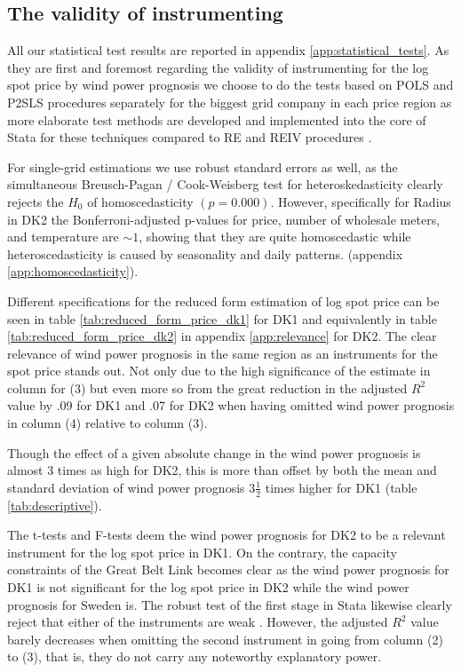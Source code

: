 \subsection{The validity of instrumenting}
\label{subsec:r_validity}
All our statistical test results are reported in appendix \ref{app:statistical_tests}. As they are first and foremost regarding the validity of instrumenting for the log spot price by wind power prognosis we choose to do the tests based on POLS and P2SLS procedures separately for the biggest grid company in each price region as more elaborate test methods are developed and implemented into the core of Stata for these techniques compared to RE and REIV procedures \citep{statacorp2017stata}.
\bigskip\par
For single-grid estimations we use robust standard errors as well, as the simultaneous Breusch-Pagan / Cook-Weisberg test for heteroskedasticity clearly rejects the $H_0$ of homoscedasticity $(p=0.000)$. However, specifically for Radius in DK2 the Bonferroni-adjusted p-values for price, number of wholesale meters, and temperature are $\sim1$, showing that they are quite homoscedastic while heteroscedasticity is caused by seasonality and daily patterns.
 (appendix \ref{app:homoscedasticity}).
\bigskip\par
Different specifications for the reduced form estimation of log spot price can be seen in table \ref{tab:reduced_form_price_dk1} for DK1 and equivalently in table \ref{tab:reduced_form_price_dk2} in appendix \ref{app:relevance} for DK2. The clear relevance of wind power prognosis in the same region as an instruments for the spot price stands out. Not only due to the high significance of the estimate in column for (3) but even more so from the great reduction in the adjusted $R^2$ value by .09 for DK1 and .07 for DK2 when having omitted wind power prognosis in column (4) relative to column (3).
\par
Though the effect of a given absolute change in the wind power prognosis is almost 3 times as high for DK2, this is more than offset by both the mean and standard deviation of wind power prognosis 3$\frac{1}{2}$ times higher for DK1 (table \ref{tab:descriptive}).
\par
The t-tests and F-tests deem the wind power prognosis for DK2 to be a relevant instrument for the log spot price in DK1. On the contrary, the capacity constraints of the Great Belt Link becomes clear as the wind power prognosis for DK1 is not significant for the log spot price in DK2 while the wind power prognosis for Sweden is. The robust test of the first stage in Stata likewise clearly reject that either of the instruments are weak \citep{statacorp2017stata}. However, the adjusted $R^2$ value barely decreases when omitting the second instrument in going from column (2) to (3), that is, they do not carry any noteworthy explanatory power.

